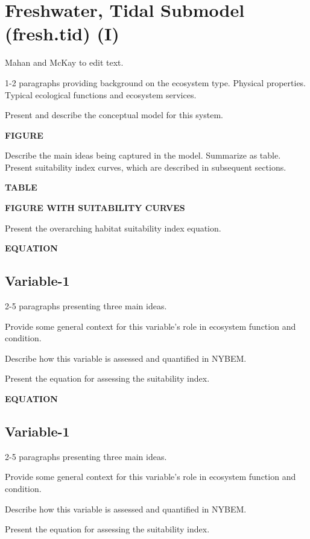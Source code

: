 \documentclass[
]{book}
\begin{document}
\hypertarget{freshwater-tidal-submodel-fresh.tid-i}{%
\section{Freshwater, Tidal Submodel (fresh.tid) (I)}\label{freshwater-tidal-submodel-fresh.tid-i}}

{Mahan and McKay to edit text.}

1-2 paragraphs providing background on the ecosystem type. Physical properties. Typical ecological functions and ecosystem services.

Present and describe the conceptual model for this system.

\textbf{FIGURE}

Describe the main ideas being captured in the model. Summarize as table. Present suitability index curves, which are described in subsequent sections.

\textbf{TABLE}

\textbf{FIGURE WITH SUITABILITY CURVES}

Present the overarching habitat suitability index equation.

\textbf{EQUATION}

\hypertarget{variable-1}{%
\subsection{Variable-1}\label{variable-1}}

2-5 paragraphs presenting three main ideas.

Provide some general context for this variable's role in ecosystem function and condition.

Describe how this variable is assessed and quantified in NYBEM.

Present the equation for assessing the suitability index.

\textbf{EQUATION}

\hypertarget{variable-1-1}{%
\subsection{Variable-1}\label{variable-1-1}}

2-5 paragraphs presenting three main ideas.

Provide some general context for this variable's role in ecosystem function and condition.

Describe how this variable is assessed and quantified in NYBEM.

Present the equation for assessing the suitability index.
\end{document}
